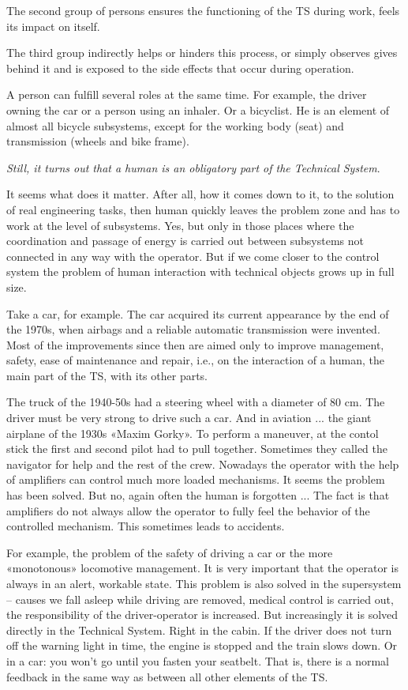 \documentclass[11pt,a4paper]{article}
\begin{document}
The second group of persons ensures the functioning of the TS during work,
feels its impact on itself.

The third group indirectly helps or hinders this process, or simply observes
gives behind it and is exposed to the side effects that occur during
operation. 

A person can fulfill several roles at the same time. For example, the driver
owning the car or a person using an inhaler. Or a bicyclist. He is an element
of almost all bicycle subsystems, except for the working body (seat) and
transmission (wheels and bike frame).

\emph{Still, it turns out that a human is an obligatory part of the Technical
  System}.

It seems what does it matter. After all, how it comes down to it, to the
solution of real engineering tasks, then human quickly leaves the problem zone
and has to work at the level of subsystems. Yes, but only in those places
where the coordination and passage of energy is carried out between subsystems
not connected in any way with the operator. But if we come closer to the
control system the problem of human interaction with technical objects grows
up in full size.

Take a car, for example. The car acquired its current appearance by the end of
the 1970s, when airbags and a reliable automatic transmission were invented.
Most of the improvements since then are aimed only to improve management,
safety, ease of maintenance and repair, i.e., on the interaction of a human,
the main part of the TS, with its other parts.

The truck of the 1940-50s had a steering wheel with a diameter of 80 cm. The
driver must be very strong to drive such a car. And in aviation ... the giant
airplane of the 1930s «Maxim Gorky». To perform a maneuver, at the contol
stick the first and second pilot had to pull together. Sometimes they called
the navigator for help and the rest of the crew. Nowadays the operator with
the help of amplifiers can control much more loaded mechanisms. It seems the
problem has been solved. But no, again often the human is forgotten ... The
fact is that amplifiers do not always allow the operator to fully feel the
behavior of the controlled mechanism. This sometimes leads to accidents.

For example, the problem of the safety of driving a car or the more
«monotonous» locomotive management. It is very important that the operator is
always in an alert, workable state. This problem is also solved in the
supersystem -- causes we fall asleep while driving are removed, medical
control is carried out, the responsibility of the driver-operator is
increased.  But increasingly it is solved directly in the Technical System.
Right in the cabin. If the driver does not turn off the warning light in time,
the engine is stopped and the train slows down. Or in a car: you won't go
until you fasten your seatbelt.  That is, there is a normal feedback in the
same way as between all other elements of the TS.
\end{document}
